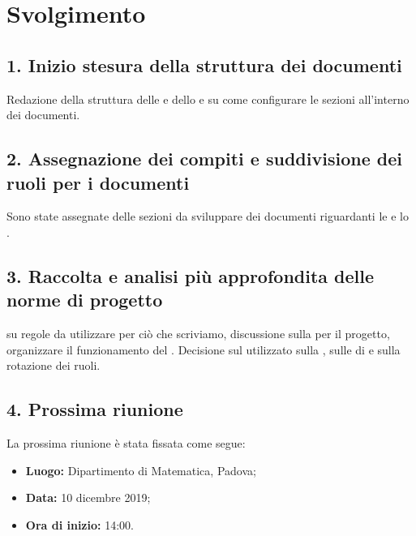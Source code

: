 \newpage
\section*{Svolgimento}

\subsection*{1. Inizio stesura della struttura dei documenti }

Redazione della struttura delle  e dello  e su come configurare le sezioni all'interno dei documenti.

\subsection*{2. Assegnazione dei compiti e suddivisione dei ruoli per i documenti }

Sono state assegnate delle sezioni da sviluppare dei documenti riguardanti le  e lo .

\subsection*{3. Raccolta e analisi più approfondita delle norme di progetto }


 su regole da utilizzare per ciò che scriviamo, discussione sulla  per il progetto, organizzare il funzionamento del . Decisione sul  utilizzato sulla , sulle  di  e sulla rotazione dei ruoli.

\subsection*{4. Prossima riunione}

La prossima riunione è stata fissata come segue:
\begin{itemize}
	\item \textbf{Luogo:} Dipartimento di Matematica, Padova;

	\item \textbf{Data:} 10 dicembre 2019;

	\item \textbf{Ora di inizio:} 14:00.
\end{itemize}
